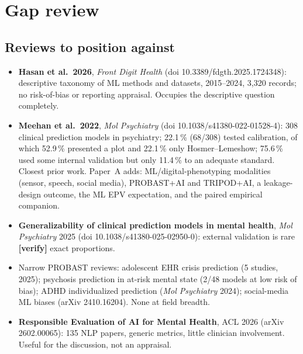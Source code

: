 \documentclass[11pt,a4paper]{article}
\newcommand{\verify}{\textcolor{accent}{\textbf{[verify]}}}
\begin{document}
\section{Gap review}
\subsection{Reviews to position against}
\begin{itemize}
\item \textbf{Hasan et al.\ 2026}, \emph{Front Digit Health} (doi 10.3389/fdgth.2025.1724348): descriptive
taxonomy of ML methods and datasets, 2015--2024, 3{,}320 records; no risk-of-bias or reporting
appraisal. Occupies the descriptive question completely.
\item \textbf{Meehan et al.\ 2022}, \emph{Mol Psychiatry} (doi 10.1038/s41380-022-01528-4): 308 clinical
prediction models in psychiatry; 22.1\,\% (68/308) tested calibration, of which 52.9\,\% presented a
plot and 22.1\,\% only Hosmer--Lemeshow; 75.6\,\% used some internal validation but only 11.4\,\% to an
adequate standard. Closest prior work. Paper~A adds: ML/digital-phenotyping modalities
(sensor, speech, social media), PROBAST+AI and TRIPOD+AI, a leakage-design outcome, the ML EPV
expectation, and the paired empirical companion.
\item \textbf{Generalizability of clinical prediction models in mental health}, \emph{Mol Psychiatry}
2025 (doi 10.1038/s41380-025-02950-0): external validation is rare \verify{} exact proportions.
\item Narrow PROBAST reviews: adolescent EHR crisis prediction (5 studies, 2025); psychosis
prediction in at-risk mental state (2/48 models at low risk of bias); ADHD individualized prediction
(\emph{Mol Psychiatry} 2024); social-media ML biases (arXiv 2410.16204). None at field breadth.
\item \textbf{Responsible Evaluation of AI for Mental Health}, ACL 2026 (arXiv 2602.00065): 135 NLP
papers, generic metrics, little clinician involvement. Useful for the discussion, not an appraisal.
\end{itemize}
\end{document}

